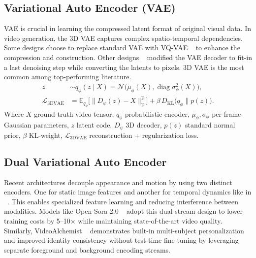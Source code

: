 \subsection{Variational Auto Encoder (VAE)}
VAE is crucial in learning the compressed latent format of original visual data. In video generation, the 3D VAE captures complex spatio-temporal dependencies. Some designs choose to replace standard VAE with VQ-VAE ~\cite{VQVAE2017, VQVAE2019} to enhance the compression and construction. Other designs ~\cite{hacohen2025ltxvideo} modified the VAE decoder to fit-in a last denoising step while converting the latents to pixels. 3D VAE is the most common among top-performing literature.
\begin{align}
z &\sim q_\phi(z\!\mid\!X)= \mathcal{N}\!\bigl(\mu_\phi(X),\operatorname{diag}\sigma_\phi^{2}(X)\bigr), \\
\mathcal{L}_{\text{3DVAE}} &=
\mathbb{E}_{q_\phi}\!\bigl[\lVert D_\psi(z)-X\rVert_2^{2}\bigr]+
\beta\,D_{\mathrm{KL}}\!\bigl(q_\phi\|p(z)\bigr).
\end{align}
Where $X$ ground-truth video tensor, $q_\phi$ probabilistic encoder, $\mu_\phi,\sigma_\phi$ per-frame Gaussian parameters, $z$ latent code, $D_\psi$ 3D decoder, $p(z)$ standard normal prior, $\beta$ KL-weight, $\mathcal{L}_{\text{3DVAE}}$ reconstruction + regularization loss.

\subsection{Dual Variational Auto Encoder}
Recent architectures decouple appearance and motion by using two distinct encoders. One for static image features and another for temporal dynamics like in ~\cite{chen2025hunyuanvideoavatar, hu2025hunyuancustom, peng2025opensora2, liu2025phantom, chen2025videoalchemist, polyak2024moviegen}. This enables specialized feature learning and reducing interference between modalities. Models like Open-Sora 2.0 ~\cite{peng2025opensora2} adopt this dual-stream design to lower training costs by 5–10× while maintaining state-of-the-art video quality. Similarly, VideoAlchemist ~\cite{chen2025videoalchemist} demonstrates built-in multi-subject personalization and improved identity consistency without test-time fine-tuning by leveraging separate foreground and background encoding streams.

